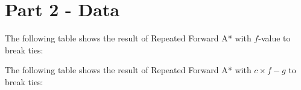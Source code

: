 \section{Part 2 - Data}

The following table shows the result of Repeated Forward A* with $f$-value to
break ties:


The following table shows the result of Repeated Forward A* with $c\times f-g$
to break ties:

